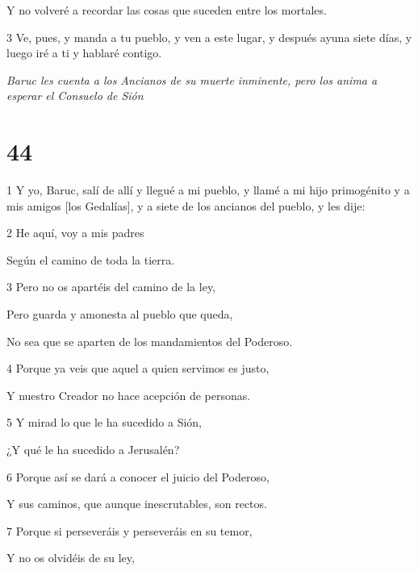 \par Y no volveré a recordar las cosas que suceden entre los mortales.

\par 3 Ve, pues, y manda a tu pueblo, y ven a este lugar, y después ayuna siete días, y luego iré a ti y hablaré contigo.

\par \textit{Baruc les cuenta a los Ancianos de su muerte inminente, pero los anima a esperar el Consuelo de Sión}

\chapter{44}

\par 1 Y yo, Baruc, salí de allí y llegué a mi pueblo, y llamé a mi hijo primogénito y a mis amigos [los Gedalías], y a siete de los ancianos del pueblo, y les dije:

\par 2 He aquí, voy a mis padres

\par Según el camino de toda la tierra.

\par 3 Pero no os apartéis del camino de la ley,

\par Pero guarda y amonesta al pueblo que queda,

\par No sea que se aparten de los mandamientos del Poderoso.

\par 4 Porque ya veis que aquel a quien servimos es justo,

\par Y nuestro Creador no hace acepción de personas.

\par 5 Y mirad lo que le ha sucedido a Sión,

\par ¿Y qué le ha sucedido a Jerusalén?

\par 6 Porque así se dará a conocer el juicio del Poderoso,

\par Y sus caminos, que aunque inescrutables, son rectos.

\par 7 Porque si perseveráis y perseveráis en su temor,

\par Y no os olvidéis de su ley,

